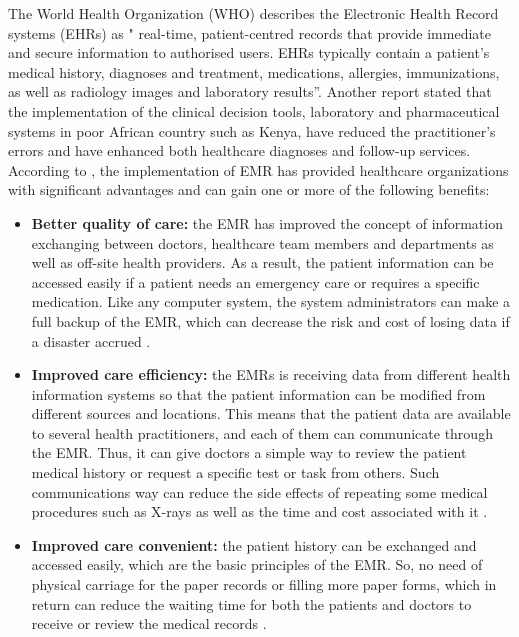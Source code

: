 
%
%
The World Health Organization (WHO) \cite{WorldHealthOrganization2016} describes the Electronic Health Record systems (EHRs) as " real-time, patient-centred records that provide immediate and secure information to authorised users. EHRs typically contain a patient's medical history, diagnoses and treatment, medications, allergies, immunizations, as well as radiology images and laboratory results”. Another report \cite{WorldHealthOrganization2013} stated that the implementation of the clinical decision tools, laboratory and pharmaceutical systems in poor African country such as Kenya, have reduced the practitioner's errors and have enhanced both healthcare diagnoses and follow-up services. According to \cite{OfHealth}, the implementation of EMR has provided healthcare organizations with significant advantages and can gain one or more of the following benefits:
\begin{itemize}
	\item \textbf{Better quality of care:} the EMR has improved the concept of information exchanging between doctors, healthcare team members and departments as well as off-site health providers. As a result, the patient information can be accessed easily if a patient needs an emergency care or requires a specific medication. Like any computer system, the system administrators can make a full backup of the EMR, which can decrease the risk and cost of losing data if a disaster accrued \cite{OfHealth}.
	\item \textbf{Improved care efficiency:} the EMRs is receiving data from different health information systems so that the patient information can be modified from different sources and locations. This means that the patient data are available to several health practitioners, and each of them can communicate through the EMR. Thus, it can give doctors a simple way to review the patient medical history or request a specific test or task from others. Such communications way can reduce the side effects of repeating some medical procedures such as X-rays as well as the time and cost associated with it   \cite{OfHealth}. 
	\item \textbf{Improved care convenient:} the patient history can be exchanged and accessed easily, which are the basic principles of the EMR. So, no need of physical carriage for the paper records or filling more paper forms, which in return can reduce the waiting time for both the patients and doctors to receive or review the medical records  \cite{OfHealth}.
\end{itemize}

